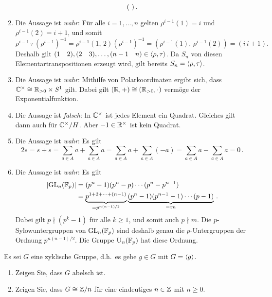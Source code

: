 \begin{solution}
\begin{enumerate}
\[\begin{psmallmatrix}
              \end{psmallmatrix} \,.
      \]
    \item
      Die Aussage ist \emph{wahr}:
      Für alle $i = 1, \dotsc, n$ gelten $\rho^{i-1}(1) = i$ und $\rho^{i-1}(2) = i+1$, und somit
      \[
        \rho^{i-1} \, \tau \, (\rho^{i-1})^{-1}
        = \rho^{i-1} (1,\, 2) (\rho^{i-1})^{-1}
        = (\rho^{i-1}(1),\, \rho^{i-1}(2))
        = (i\, i+1).
      \]
      Deshalb gilt $(1 \quad 2), (2 \quad 3), \dotsc, (n-1 \quad n) \in \langle\rho, \tau\rangle$.
      Da $S_n$ von diesen Elementartranspositionen erzeugt wird, gilt bereits $S_n = \langle\rho, \tau\rangle$.
    \item
      Die Aussage ist \emph{wahr}:
      Mithilfe von Polarkoordinaten ergibt sich, dass $\mathbb{C}^\times \cong \mathbb{R}_{> 0} \times S^1$ gilt.
      Dabei gilt $(\mathbb{R}, +) \cong (\mathbb{R}_{>0}, \cdot)$ vermöge der Exponentialfunktion.
    \item
      Die Aussage ist \emph{falsch}:
      In $\mathbb{C}^\times$ ist jedes Element ein Quadrat.
      Gleiches gilt dann auch für $\mathbb{C}^\times/H$.
      Aber $-1 \in \mathbb{R}^\times$ ist kein Quadrat.
    \item
      Die Aussage ist \emph{wahr}:
      Es gilt
      \[
          2 s
        = s + s
        = \sum_{a \in A} a + \sum_{a \in A} a
        = \sum_{a \in A} a + \sum_{a \in A} (-a)
        = \sum_{a \in A} a - \sum_{a \in A} a
        = 0 \,.
      \]
    \item
      Die Aussage ist \emph{wahr}:
      Es gilt
      \begin{align*}
            |{\operatorname{GL}_n(\mathbb{F}_p)}|
        &=  (p^n - 1)(p^n - p) \dotsm (p^n - p^{n-1}) \\
        &=  \underbrace{p^{1 + 2 + \dotsb + (n-1)}}_{= p^{n(n-1)/2}}
            \underbrace{(p^n - 1)(p^{n-1} - 1) \dotsm (p - 1)}_{\eqqcolon m} \,.
      \end{align*}
      Dabei gilt $p \nmid (p^k - 1)$ für alle $k \geq 1$, und somit auch $p \nmid m$.
      Die $p$-Sylowuntergruppen von $\operatorname{GL}_n(\mathbb{F}_p)$ sind deshalb genau die $p$-Untergruppen der Ordnung $p^{n(n-1)/2}$.
      Die Gruppe $\operatorname{U}_n(\mathbb{F}_p)$ hat diese Ordnung.
  \end{enumerate}
\end{solution}


\begin{question}[subtitle = Klassifikation zyklischer Gruppen]
  Es sei $G$ eine zyklische Gruppe, d.h.\ es gebe $g \in G$ mit $G = \langle g\rangle$.
  \begin{enumerate}
    \item
      Zeigen Sie, dass $G$ abelsch ist.
    \item
      Zeigen Sie, dass $G \cong \mathbb{Z}/n$ für eine eindeutiges $n \in \mathbb{Z}$ mit $n \geq 0$.
  \end{enumerate}
\end{question}


